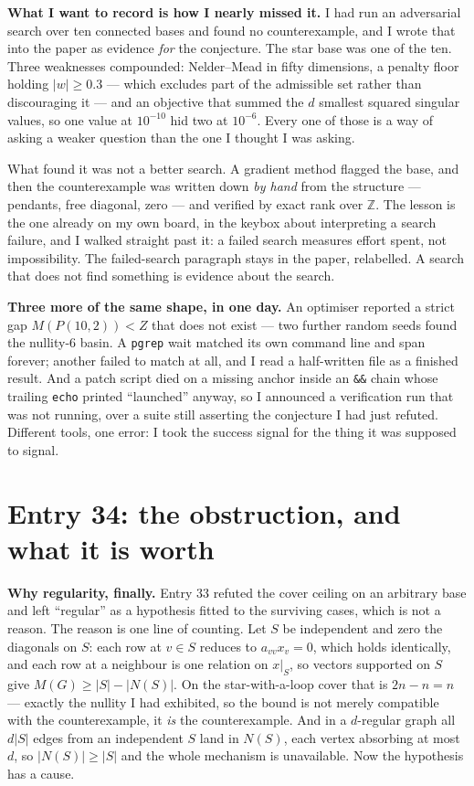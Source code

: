 \documentclass[12pt]{article}
\begin{document}
\textbf{What I want to record is how I nearly missed it.} I had run an
adversarial search over ten connected bases and found no counterexample, and I
wrote that into the paper as evidence \emph{for} the conjecture. The star base
was one of the ten. Three weaknesses compounded: Nelder--Mead in fifty
dimensions, a penalty floor holding $|w|\ge0.3$ --- which excludes part of the
admissible set rather than discouraging it --- and an objective that summed the
$d$ smallest squared singular values, so one value at $10^{-10}$ hid two at
$10^{-6}$. Every one of those is a way of asking a weaker question than the one
I thought I was asking.

What found it was not a better search. A gradient method flagged the base, and
then the counterexample was written down \emph{by hand} from the structure ---
pendants, free diagonal, zero --- and verified by exact rank over $\mathbb Z$.
The lesson is the one already on my own board, in the keybox about interpreting
a search failure, and I walked straight past it: a failed search measures effort
spent, not impossibility. The failed-search paragraph stays in the paper,
relabelled. A search that does not find something is evidence about the search.

\textbf{Three more of the same shape, in one day.} An optimiser reported a
strict gap $M(P(10,2))<Z$ that does not exist --- two further random seeds found
the nullity-$6$ basin. A \texttt{pgrep} wait matched its own command line and
span forever; another failed to match at all, and I read a half-written file as
a finished result. And a patch script died on a missing anchor inside an
\texttt{\&\&} chain whose trailing \texttt{echo} printed ``launched'' anyway, so
I announced a verification run that was not running, over a suite still
asserting the conjecture I had just refuted. Different tools, one error: I took
the success signal for the thing it was supposed to signal.

\section*{Entry 34: the obstruction, and what it is worth}

\textbf{Why regularity, finally.} Entry 33 refuted the cover ceiling on an
arbitrary base and left ``regular'' as a hypothesis fitted to the surviving
cases, which is not a reason. The reason is one line of counting. Let $S$ be
independent and zero the diagonals on $S$: each row at $v\in S$ reduces to
$a_{vv}x_v=0$, which holds identically, and each row at a neighbour is one
relation on $x|_S$, so vectors supported on $S$ give
$M(G)\ge|S|-|N(S)|$. On the star-with-a-loop cover that is $2n-n=n$ --- exactly
the nullity I had exhibited, so the bound is not merely compatible with the
counterexample, it \emph{is} the counterexample. And in a $d$-regular graph all
$d|S|$ edges from an independent $S$ land in $N(S)$, each vertex absorbing at
most $d$, so $|N(S)|\ge|S|$ and the whole mechanism is unavailable. Now the
hypothesis has a cause.
\end{document}
